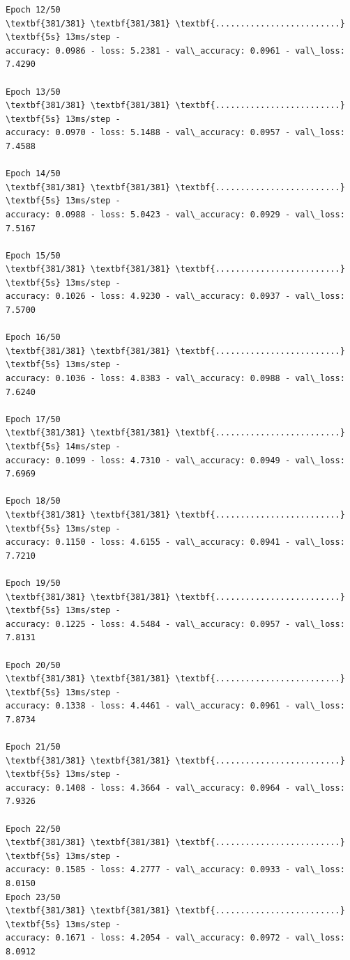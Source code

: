 \documentclass[11pt]{article}
\begin{document}
\begin{tcolorbox}[breakable, size=fbox, boxrule=1pt, pad at break*=1mm,colback=cellbackground, colframe=cellborder]
\begin{Verbatim}[commandchars=\\\{\}]
Epoch 12/50
\textbf{381/381} \textbf{381/381} \textbf{.........................} \textbf{5s} 13ms/step -
accuracy: 0.0986 - loss: 5.2381 - val\_accuracy: 0.0961 - val\_loss: 7.4290

Epoch 13/50
\textbf{381/381} \textbf{381/381} \textbf{.........................} \textbf{5s} 13ms/step -
accuracy: 0.0970 - loss: 5.1488 - val\_accuracy: 0.0957 - val\_loss: 7.4588

Epoch 14/50
\textbf{381/381} \textbf{381/381} \textbf{.........................} \textbf{5s} 13ms/step -
accuracy: 0.0988 - loss: 5.0423 - val\_accuracy: 0.0929 - val\_loss: 7.5167

Epoch 15/50
\textbf{381/381} \textbf{381/381} \textbf{.........................} \textbf{5s} 13ms/step -
accuracy: 0.1026 - loss: 4.9230 - val\_accuracy: 0.0937 - val\_loss: 7.5700

Epoch 16/50
\textbf{381/381} \textbf{381/381} \textbf{.........................} \textbf{5s} 13ms/step -
accuracy: 0.1036 - loss: 4.8383 - val\_accuracy: 0.0988 - val\_loss: 7.6240

Epoch 17/50
\textbf{381/381} \textbf{381/381} \textbf{.........................} \textbf{5s} 14ms/step -
accuracy: 0.1099 - loss: 4.7310 - val\_accuracy: 0.0949 - val\_loss: 7.6969

Epoch 18/50
\textbf{381/381} \textbf{381/381} \textbf{.........................} \textbf{5s} 13ms/step -
accuracy: 0.1150 - loss: 4.6155 - val\_accuracy: 0.0941 - val\_loss: 7.7210

Epoch 19/50
\textbf{381/381} \textbf{381/381} \textbf{.........................} \textbf{5s} 13ms/step -
accuracy: 0.1225 - loss: 4.5484 - val\_accuracy: 0.0957 - val\_loss: 7.8131

Epoch 20/50
\textbf{381/381} \textbf{381/381} \textbf{.........................} \textbf{5s} 13ms/step -
accuracy: 0.1338 - loss: 4.4461 - val\_accuracy: 0.0961 - val\_loss: 7.8734

Epoch 21/50
\textbf{381/381} \textbf{381/381} \textbf{.........................} \textbf{5s} 13ms/step -
accuracy: 0.1408 - loss: 4.3664 - val\_accuracy: 0.0964 - val\_loss: 7.9326

Epoch 22/50
\textbf{381/381} \textbf{381/381} \textbf{.........................} \textbf{5s} 13ms/step -
accuracy: 0.1585 - loss: 4.2777 - val\_accuracy: 0.0933 - val\_loss: 8.0150
Epoch 23/50
\textbf{381/381} \textbf{381/381} \textbf{.........................} \textbf{5s} 13ms/step -
accuracy: 0.1671 - loss: 4.2054 - val\_accuracy: 0.0972 - val\_loss: 8.0912


\end{Verbatim}
\end{tcolorbox}
\end{document}
